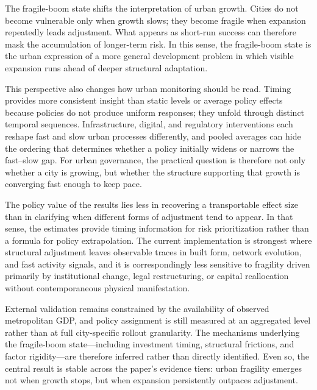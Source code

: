 \documentclass[oneside,pdflatex,sn-nature]{sn-jnl}
\begin{document}
The fragile-boom state shifts the interpretation of urban growth. Cities do not become vulnerable only when growth slows; they become fragile when expansion repeatedly leads adjustment. What appears as short-run success can therefore mask the accumulation of longer-term risk. In this sense, the fragile-boom state is the urban expression of a more general development problem in which visible expansion runs ahead of deeper structural adaptation.\cite{hausmann2005growth,eichengreen2012slowdown}

This perspective also changes how urban monitoring should be read. Timing provides more consistent insight than static levels or average policy effects because policies do not produce uniform responses; they unfold through distinct temporal sequences. Infrastructure, digital, and regulatory interventions each reshape fast and slow urban processes differently, and pooled averages can hide the ordering that determines whether a policy initially widens or narrows the fast--slow gap. For urban governance, the practical question is therefore not only whether a city is growing, but whether the structure supporting that growth is converging fast enough to keep pace.

The policy value of the results lies less in recovering a transportable effect size than in clarifying when different forms of adjustment tend to appear. In that sense, the estimates provide timing information for risk prioritization rather than a formula for policy extrapolation. The current implementation is strongest where structural adjustment leaves observable traces in built form, network evolution, and fast activity signals, and it is correspondingly less sensitive to fragility driven primarily by institutional change, legal restructuring, or capital reallocation without contemporaneous physical manifestation.

External validation remains constrained by the availability of observed metropolitan GDP, and policy assignment is still measured at an aggregated level rather than at full city-specific rollout granularity. The mechanisms underlying the fragile-boom state---including investment timing, structural frictions, and factor rigidity---are therefore inferred rather than directly identified. Even so, the central result is stable across the paper's evidence tiers: urban fragility emerges not when growth stops, but when expansion persistently outpaces adjustment.

\nocite{sun2021event,santanna2020dr,athey2021matrix,abadie2010synthetic}


\end{document}
